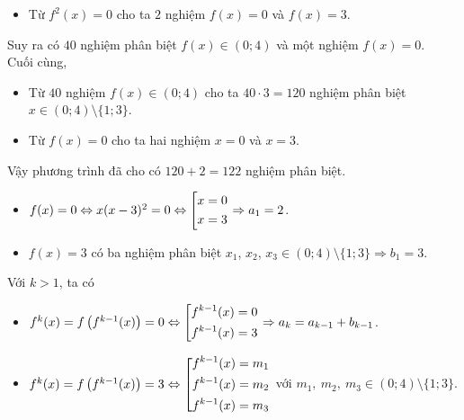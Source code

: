 \begin{ex}
{\begin{itemize}
\item Từ $f^2(x)=0$ cho ta $2$ nghiệm $f(x)=0$ và $f(x)=3$.
\end{itemize}
Suy ra có $40$ nghiệm phân biệt $f(x)\in (0;4)$ và một nghiệm $f(x)=0$.\\
Cuối cùng,
\begin{itemize}
\item Từ $40$ nghiệm $f(x)\in(0;4)$ cho ta $40\cdot 3=120$ nghiệm phân biệt $x\in (0;4)\setminus\{1;3\}$.
\item Từ $f(x)=0$ cho ta hai nghiệm $x=0$ và $x=3$.
\end{itemize}
Vậy phương trình đã cho có $120+2=122$ nghiệm phân biệt.
\begin{itemize}
\item $f(x)=0\Leftrightarrow x(x-3)^2=0\Leftrightarrow\left[\begin{aligned}&x=0\\ &x=3\end{aligned}\right.\Rightarrow a_1=2$.
\item $f(x)=3$ có ba nghiệm phân biệt $x_1$, $x_2$, $x_3\in(0;4)\setminus\{1;3\}\Rightarrow b_1=3$.
\end{itemize}
Với $k>1$, ta có
\begin{itemize}
\item  $f^k(x)=f\left(f^{k-1}(x)\right)=0\Leftrightarrow\left[\begin{aligned}&f^{k-1}(x)=0\\ &f^{k-1}(x)=3\end{aligned}\right.\Rightarrow a_k=a_{k-1}+b_{k-1}$.
\item $f^k(x)=f\left(f^{k-1}(x)\right)=3\Leftrightarrow \left[\begin{aligned}&f^{k-1}(x)=m_1\\ &f^{k-1}(x)=m_2\\ &f^{k-1}(x)=m_3\end{aligned}\right.$ với $m_1,\ m_2,\ m_3\in (0;4)\setminus\{1;3\}$.\\

\end{itemize}}
\end{ex}
